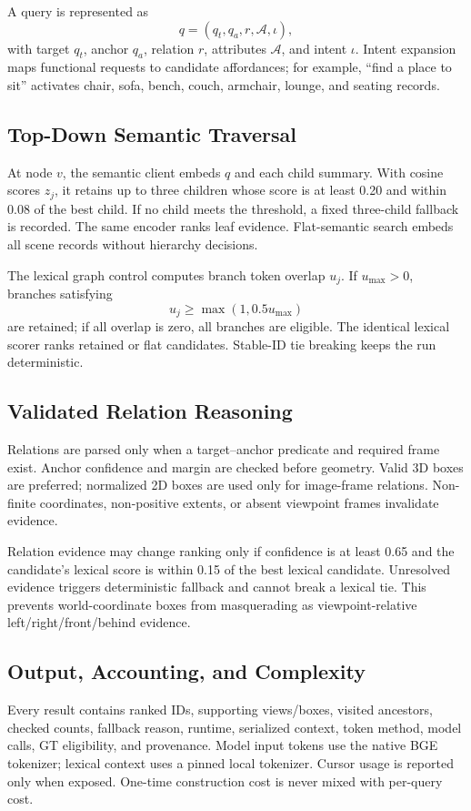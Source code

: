 \documentclass[10pt,twocolumn,letterpaper]{article}
\begin{document}
A query is represented as
\begin{equation}
q=(q_t,q_a,r,\mathcal{A},\iota),
\end{equation}
with target $q_t$, anchor $q_a$, relation $r$, attributes $\mathcal{A}$, and
intent $\iota$. Intent expansion maps functional requests to candidate
affordances; for example, ``find a place to sit'' activates chair, sofa, bench,
couch, armchair, lounge, and seating records.

\subsection{Top-Down Semantic Traversal}
At node $v$, the semantic client embeds $q$ and each child summary. With cosine
scores $z_j$, it retains up to three children whose score is at least 0.20 and
within 0.08 of the best child. If no child meets the threshold, a fixed
three-child fallback is recorded. The same encoder ranks leaf evidence.
Flat-semantic search embeds all scene records without hierarchy decisions.

The lexical graph control computes branch token overlap $u_j$. If
$u_{\max}>0$, branches satisfying
\begin{equation}
u_j\geq\max(1,0.5u_{\max})
\label{eq:lexical-gate}
\end{equation}
are retained; if all overlap is zero, all branches are eligible. The identical
lexical scorer ranks retained or flat candidates. Stable-ID tie breaking keeps
the run deterministic.

\subsection{Validated Relation Reasoning}
Relations are parsed only when a target--anchor predicate and required frame
exist. Anchor confidence and margin are checked before geometry. Valid 3D
boxes are preferred; normalized 2D boxes are used only for image-frame
relations. Non-finite coordinates, non-positive extents, or absent viewpoint
frames invalidate evidence.

Relation evidence may change ranking only if confidence is at least 0.65 and
the candidate's lexical score is within 0.15 of the best lexical candidate.
Unresolved evidence triggers deterministic fallback and cannot break a lexical
tie. This prevents world-coordinate boxes from masquerading as
viewpoint-relative left/right/front/behind evidence.

\subsection{Output, Accounting, and Complexity}
Every result contains ranked IDs, supporting views/boxes, visited ancestors,
checked counts, fallback reason, runtime, serialized context, token method,
model calls, GT eligibility, and provenance. Model input tokens use the native
BGE tokenizer; lexical context uses a pinned local tokenizer. Cursor usage is
reported only when exposed. One-time construction cost is never mixed with
per-query cost.
\end{document}
